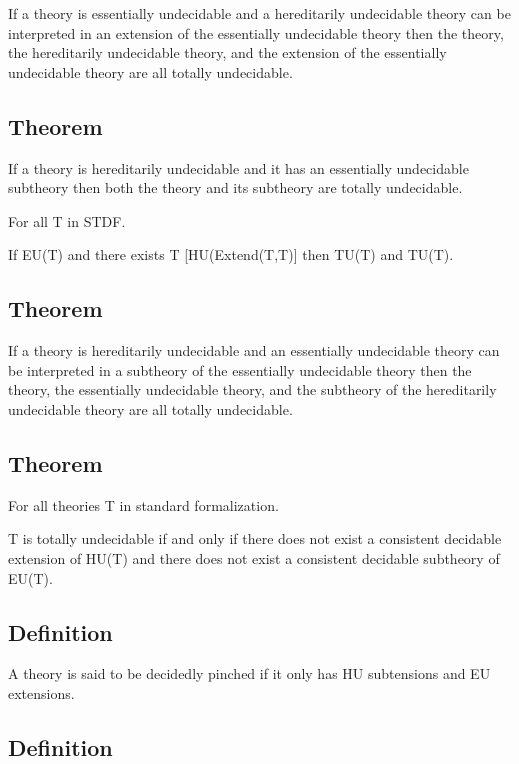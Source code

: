 If a theory is essentially undecidable and a hereditarily undecidable
theory can be interpreted in an extension of the essentially undecidable
theory then the theory, the hereditarily undecidable theory, and the
extension of the essentially undecidable theory are all totally
undecidable.

\hypertarget{theorem-2}{%
\subsection{Theorem}\label{theorem-2}}

If a theory is hereditarily undecidable and it has an essentially
undecidable subtheory then both the theory and its subtheory are totally
undecidable.

For all T in STDF.

If EU(T) and there exists T\textquotesingle{}
{[}HU(Extend(T,T\textquotesingle){]} then TU(T) and
TU(T\textquotesingle).

\hypertarget{theorem-3}{%
\subsection{Theorem}\label{theorem-3}}

If a theory is hereditarily undecidable and an essentially undecidable
theory can be interpreted in a subtheory of the essentially undecidable
theory then the theory, the essentially undecidable theory, and the
subtheory of the hereditarily undecidable theory are all totally
undecidable.

\hypertarget{theorem-4}{%
\subsection{Theorem}\label{theorem-4}}

For all theories T in standard formalization.

T is totally undecidable if and only if there does not exist a
consistent decidable extension of HU(T) and there does not exist a
consistent decidable subtheory of EU(T).

\hypertarget{definition-1}{%
\subsection{Definition}\label{definition-1}}

A theory is said to be decidedly pinched if it only has HU subtensions
and EU extensions.

\hypertarget{definition-2}{%
\subsection{Definition}\label{definition-2}}

